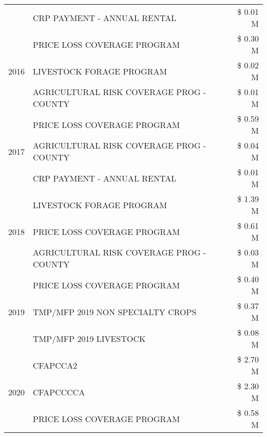 \begin{tabular}{llr}
 & CRP PAYMENT - ANNUAL RENTAL & \$ 0.01 M \\
\cline{1-3}
\multirow[t]{3}{*}{2016} & PRICE LOSS COVERAGE PROGRAM & \$ 0.30 M \\
 & LIVESTOCK FORAGE PROGRAM & \$ 0.02 M \\
 & AGRICULTURAL RISK COVERAGE PROG - COUNTY & \$ 0.01 M \\
\cline{1-3}
\multirow[t]{3}{*}{2017} & PRICE LOSS COVERAGE PROGRAM & \$ 0.59 M \\
 & AGRICULTURAL RISK COVERAGE PROG - COUNTY & \$ 0.04 M \\
 & CRP PAYMENT - ANNUAL RENTAL & \$ 0.01 M \\
\cline{1-3}
\multirow[t]{3}{*}{2018} & LIVESTOCK FORAGE PROGRAM & \$ 1.39 M \\
 & PRICE LOSS COVERAGE PROGRAM & \$ 0.61 M \\
 & AGRICULTURAL RISK COVERAGE PROG - COUNTY & \$ 0.03 M \\
\cline{1-3}
\multirow[t]{3}{*}{2019} & PRICE LOSS COVERAGE PROGRAM & \$ 0.40 M \\
 & TMP/MFP 2019 NON SPECIALTY CROPS & \$ 0.37 M \\
 & TMP/MFP 2019 LIVESTOCK & \$ 0.08 M \\
\cline{1-3}
\multirow[t]{3}{*}{2020} & CFAPCCA2 & \$ 2.70 M \\
 & CFAPCCCCA & \$ 2.30 M \\
 & PRICE LOSS COVERAGE PROGRAM & \$ 0.58 M \\
\cline{1-3}
\bottomrule
\end{tabular}
